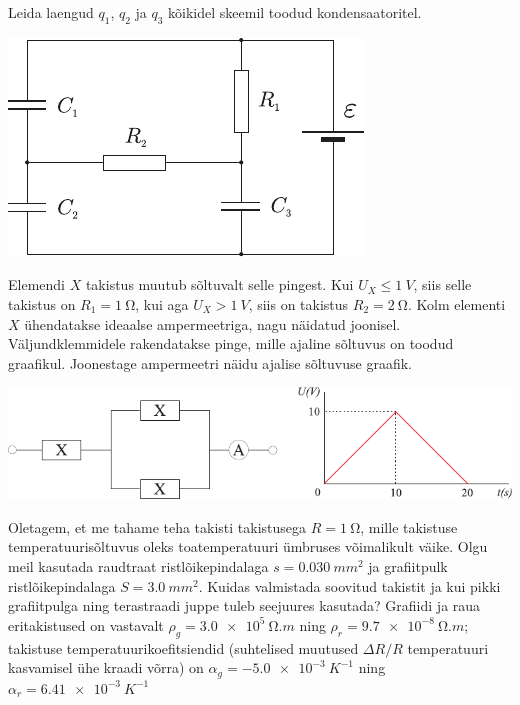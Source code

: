 \documentclass[10pt]{article}
\begin{document}
{
Leida laengud $q_1$, $q_2$ ja $q_3$ kõikidel skeemil toodud kondensaatoritel.

\begin{center}
	\includegraphics[width=0.7\linewidth]{2006-lahg-02-yl}
\end{center}
\probend
\bigskip


Elemendi $X$ takistus muutub sõltuvalt selle pingest. Kui $U_X \leq \SI{1}{V}$,
siis selle takistus on $R_1 = \SI{1}{\ohm}$, kui aga $U_X > \SI{1}{V}$, siis on takistus $R_2 =
\SI{2}{\ohm}$. Kolm elementi $X$ ühendatakse ideaalse ampermeetriga, nagu näidatud joonisel.
Väljundklemmidele rakendatakse pinge, mille ajaline sõltuvus on toodud graafikul.
Joonestage ampermeetri näidu ajalise sõltuvuse graafik.

\begin{center}
	\includegraphics[width=\linewidth]{2009-lahg-03-yl}
\end{center}
\probend
\bigskip


Oletagem, et me tahame teha takisti takistusega $R = \SI{1}{\ohm}$, mille takistuse temperatuurisõltuvus oleks toatemperatuuri ümbruses võimalikult väike. Olgu meil kasutada raudtraat ristlõikepindalaga $s = \SI{0,030}{mm^2}$ ja grafiitpulk ristlõikepindalaga $S = \SI{3,0}{mm^2}$. Kuidas valmistada soovitud takistit ja kui pikki grafiitpulga ning terastraadi juppe tuleb seejuures kasutada? Grafiidi ja raua eritakistused on vastavalt $\rho_g = \SI{3,0e5}{\ohm.m}$ ning $\rho_r = \SI{9,7e-8}{\ohm.m}$; takistuse temperatuurikoefitsiendid (suhtelised muutused $\Delta R/R$ temperatuuri kasvamisel ühe kraadi võrra) on $\alpha_g = \SI{-5,0e-3}{K^{-1}}$ ning $\alpha_r = \SI{6,41e-3}{K^{-1}}$
\probend
\bigskip

}
\end{document}
